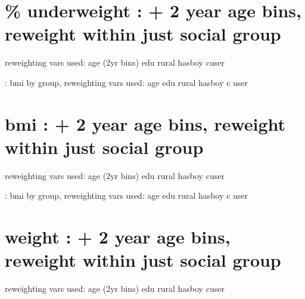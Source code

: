 \documentclass{article}
\begin{document}



\newpage 
\section{\% underweight : + 2 year age bins, reweight within just social group }

reweighting vars used: age (2yr bins) edu rural hasboy cuser

\begin{table}[H]
    \centering
    \footnotesize %
    \caption{: bmi by group, reweighting vars used: age edu rural hasboy c user}
    \label{tab:sumstat}
\end{table}



\newpage 
\section{bmi : + 2 year age bins, reweight within just social group }

reweighting vars used: age (2yr bins) edu rural hasboy cuser

\begin{table}[H]
    \centering
    \footnotesize %
    \caption{: bmi by group, reweighting vars used: age edu rural hasboy c user}
    \label{tab:sumstat}
\end{table}

\newpage 
\section{weight : + 2 year age bins, reweight within just social group }

reweighting vars used: age (2yr bins) edu rural hasboy cuser
\end{document}
